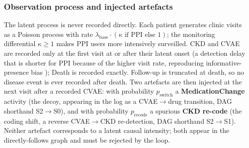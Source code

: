\documentclass[sn-vancouver-num]{sn-jnl}
\begin{document}
\subsubsection{Observation process and injected artefacts}
The latent process is never recorded directly. Each patient generates clinic visits as a Poisson process with rate $\lambda_{\text{base}} \cdot (\kappa \text{ if PPI else } 1)$; the monitoring differential $\kappa \ge 1$ makes PPI users more intensively surveilled. CKD and CVAE are recorded only at the first visit at or after their latent onset (a detection delay that is shorter for PPI because of the higher visit rate, reproducing informative-presence bias \citep{casey2016}); Death is recorded exactly. Follow-up is truncated at death, so no disease event is ever recorded after death. Two artefacts are then injected at the next visit after a recorded CVAE: with probability $p_{\text{switch}}$ a \textbf{MedicationChange} activity (the decoy, appearing in the log as a CVAE$\rightarrow$drug transition, DAG shorthand S2$\rightarrow$S0), and with probability $p_{\text{recode}}$ a spurious \textbf{CKD re-code} (the coding shift, a reverse CVAE$\rightarrow$CKD re-detection, DAG shorthand S2$\rightarrow$S1). Neither artefact corresponds to a latent causal intensity; both appear in the directly-follows graph and must be rejected by the loop.
\end{document}
